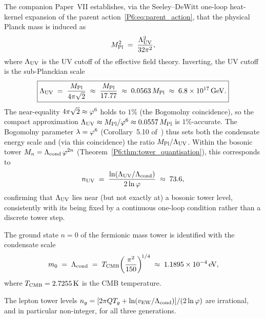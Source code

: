 \begin{theorem}
\label{P6:thm:luv_tower}
The companion Paper~VII establishes, via the Seeley--DeWitt
one-loop heat-kernel expansion of the parent
action~\eqref{P6:eq:parent_action}, that the physical Planck mass
is induced as~\cite{Paper7}
\begin{equation}
  M_{\mathrm{Pl}}^2 \;=\; \frac{\Lambda_{\mathrm{UV}}^2}{32\pi^2},
  \label{P6:eq:MPl_LUV}
\end{equation}
where $\Lambda_{\mathrm{UV}}$ is the UV cutoff of the effective field theory.
Inverting, the UV cutoff is the sub-Planckian scale
\begin{equation}
  \boxed{\Lambda_{\mathrm{UV}} \;=\; \frac{M_{\mathrm{Pl}}}{4\pi\sqrt{2}}
  \;\approx\; \frac{M_{\mathrm{Pl}}}{17.77}
  \;\approx\; 0.0563\,M_{\mathrm{Pl}}
  \;\approx\; 6.8\times10^{17}\,\mathrm{GeV}.}
  \label{P6:eq:LUV_exact}
\end{equation}
The near-equality $4\pi\sqrt{2}\approx\varphi^6$ holds to $1\%$
(the Bogomolny coincidence), so the compact approximation
$\Lambda_{\mathrm{UV}}\approx M_{\mathrm{Pl}}/\varphi^6\approx0.0557\,M_{\mathrm{Pl}}$ is $1\%$-accurate.
The Bogomolny parameter $\lambda = \varphi^6$ (Corollary~5.10 of~\cite{Paper1})
thus sets both the condensate energy scale and (via this coincidence)
the ratio $M_{\mathrm{Pl}}/\Lambda_{\mathrm{UV}}$.
Within the bosonic tower $M_n = \Lambda_{\mathrm{cond}}\,\varphi^{2n}$
(Theorem~\ref{P6:thm:tower_quantisation}), this corresponds to
\begin{equation}
  n_{\mathrm{UV}} \;=\; \frac{\ln(\Lambda_{\mathrm{UV}}/\Lambda_{\mathrm{cond}})}{2\ln\varphi}
  \;\approx\; 73.6,
  \label{P6:eq:n_UV}
\end{equation}
confirming that $\Lambda_{\mathrm{UV}}$ lies near (but not exactly at) a bosonic tower
level, consistently with its being fixed by a continuous one-loop
condition rather than a discrete tower step.
\end{theorem}

\begin{proposition}
\label{P6:prop:ground_state}
The ground state $n=0$ of the fermionic mass tower is identified with
the condensate scale
\begin{equation}
  m_0 \;=\; \Lambda_{\mathrm{cond}} \;=\; T_{\mathrm{CMB}}\!\left(\frac{\pi^2}{150}\right)^{\!1/4}
  \;\approx\; 1.1895\times10^{-4}\,\mathrm{eV},
  \label{P6:eq:ground_state}
\end{equation}
where $T_{\mathrm{CMB}} = 2.7255\,\mathrm{K}$ is the CMB temperature.
\end{proposition}

\begin{proposition}
\label{P6:prop:noninteger}
The lepton tower levels $n_g = [2\pi Q T_g + \ln(v_{\mathrm{EW}}/\Lambda_{\mathrm{cond}})]/(2\ln\varphi)$
are irrational, and in particular non-integer, for all three generations.
\end{proposition}

